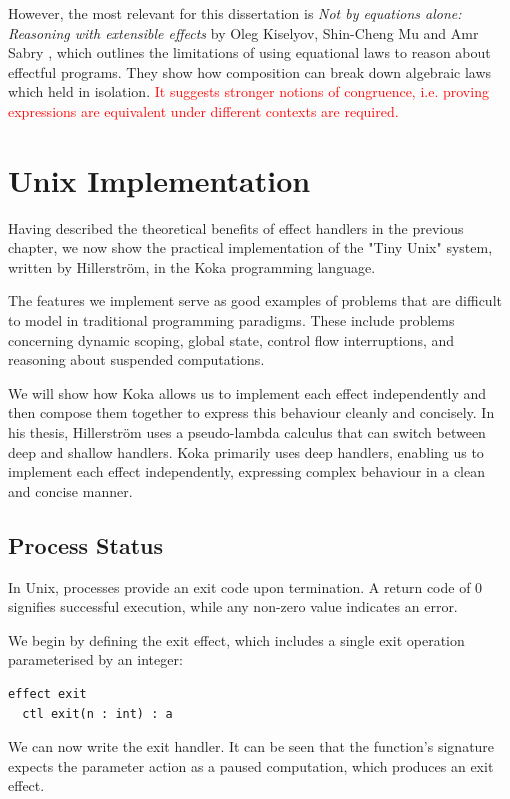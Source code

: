 \documentclass[logo,bsc,singlespacing,parskip]{infthesis}
\begin{document}
However, the most relevant for this dissertation is \textit{Not by equations alone: Reasoning with extensible effects} by Oleg Kiselyov, Shin-Cheng Mu and Amr Sabry \cite{kiselyov2021not}, which outlines the limitations of using equational laws to reason about effectful programs. They show how composition can break down algebraic laws which held in isolation. \textcolor{red}{It suggests stronger notions of congruence, i.e. proving expressions are equivalent under different contexts are required.}



\chapter{Unix Implementation}
Having described the theoretical benefits of effect handlers in the previous chapter, we now show the practical implementation of the "Tiny Unix" system, written by Hillerström, in the Koka programming language. 

The features we implement serve as good examples of problems that are difficult to model in traditional programming paradigms. These include problems concerning dynamic scoping, global state, control flow interruptions, and reasoning about suspended computations.

We will show how Koka allows us to implement each effect independently and then compose them together to express this behaviour cleanly and concisely.
In his thesis, Hillerström uses a pseudo-lambda calculus that can switch between deep and shallow handlers. Koka primarily uses deep handlers, enabling us to implement each effect independently, expressing complex behaviour in a clean and concise manner.



\section{Process Status}
In Unix, processes provide an exit code upon termination. A return code of 0 signifies successful execution, while any non-zero value indicates an error. 

We begin by defining the exit effect, which includes a single exit operation parameterised by an integer:
\begin{lstlisting}
effect exit
  ctl exit(n : int) : a
\end{lstlisting}

\vspace{1em}
We can now write the exit handler. It can be seen that the function's signature expects the parameter action as a paused computation, which produces an exit effect.
\end{document}
